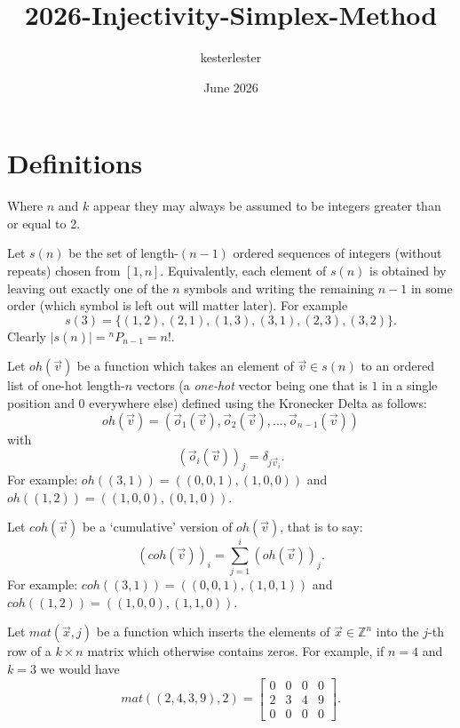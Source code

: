 \documentclass{article}
\title{2026-Injectivity-Simplex-Method}
\author{kesterlester }
\date{June 2026} %
\begin{document}
\maketitle

\section{Definitions}
Where $n$ and $k$ appear they may always be assumed to be integers  greater than or equal to 2.

\label{def:sn}Let $s(n)$ be the set of length-$(n-1)$ ordered sequences of integers (without repeats) chosen from $[1,n]$.  Equivalently, each element of $s(n)$ is obtained by leaving out exactly one of the $n$ symbols and writing the remaining $n-1$ in some order (which symbol is left out will matter later).  For example $$s(3)=\{(1,2),(2,1),(1,3),(3,1),(2,3),(3,2)\}.$$
Clearly
$|s(n)| = {}^n P_{n-1} = n!.$

\label{def:oh}Let $oh(\vec v)$ be a function which takes an element of $\vec v\in s(n)$ to an ordered list of one-hot length-$n$ vectors (a \emph{one-hot} vector being one that is $1$ in a single position and $0$ everywhere else) defined using the Kronecker Delta as follows:
$$oh(\vec v) = (\vec o_1(\vec v), \vec o_2(\vec v), ..., \vec o_{n-1}(\vec v)) $$
with
$$(\vec o_i(\vec v))_j= \delta_{j \vec v_i}.$$
For example:
$oh((3,1)) = ( (0,0,1), (1,0,0))$
and
$oh((1,2)) = ( (1,0,0), (0,1,0))$.



\label{def:coh}Let $coh(\vec v)$ be a `cumulative' version of $oh(\vec v)$, that is to say:
$$(coh(\vec v))_i = \sum_{j=1}^i (oh(\vec v))_j.$$
For example: $coh((3,1)) = ( (0,0,1), (1,0,1))$
and
$coh((1,2)) = ( (1,0,0), (1,1,0))$.


\label{def:mat}Let $mat(\vec x,j)$ be a function which inserts the elements of $\vec x\in \mathbb Z^n$ into the $j$-th row of a $k \times n$ matrix which otherwise contains zeros.
    For example, if $n=4$ and $k=3$ we would have $$mat((2,4,3,9),2) = \begin{bmatrix} 0 & 0 & 0 & 0 \\ 2 & 3 & 4 & 9 \\ 0 & 0 &0 &0\end{bmatrix}.$$
\end{document}
